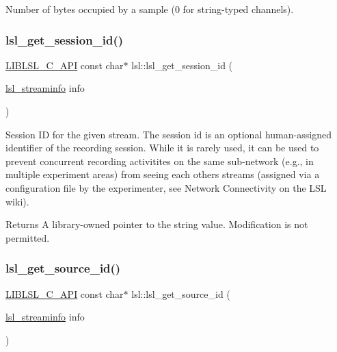 Number of bytes occupied by a sample (0 for string-\/typed channels). 

\mbox{\label{namespacelsl_ae28332bda70380cfd546fc158cd6f009}} 
\subsubsection{\texorpdfstring{lsl\+\_\+get\+\_\+session\+\_\+id()}{lsl\_get\_session\_id()}}
{\footnotesize\ttfamily \hyperlink{lsl__cpp_8h_aafd0ef1813e8be84a1420c4f1df64615}{L\+I\+B\+L\+S\+L\+\_\+\+C\+\_\+\+A\+PI} const char$\ast$ lsl\+::lsl\+\_\+get\+\_\+session\+\_\+id (\begin{DoxyParamCaption}\item[{\hyperlink{namespacelsl_aa0a9ce9956061679949daa2e35aae2e8}{lsl\+\_\+streaminfo}}]{info }\end{DoxyParamCaption})}

Session ID for the given stream. The session id is an optional human-\/assigned identifier of the recording session. While it is rarely used, it can be used to prevent concurrent recording activitites on the same sub-\/network (e.\+g., in multiple experiment areas) from seeing each other\textquotesingle{}s streams (assigned via a configuration file by the experimenter, see Network Connectivity on the L\+SL wiki). \begin{DoxyReturn}{Returns}
A library-\/owned pointer to the string value. Modification is not permitted. 
\end{DoxyReturn}
\mbox{\label{namespacelsl_ad2987f3c32e0edae147498a8870a3215}} 
\subsubsection{\texorpdfstring{lsl\+\_\+get\+\_\+source\+\_\+id()}{lsl\_get\_source\_id()}}
{\footnotesize\ttfamily \hyperlink{lsl__cpp_8h_aafd0ef1813e8be84a1420c4f1df64615}{L\+I\+B\+L\+S\+L\+\_\+\+C\+\_\+\+A\+PI} const char$\ast$ lsl\+::lsl\+\_\+get\+\_\+source\+\_\+id (\begin{DoxyParamCaption}\item[{\hyperlink{namespacelsl_aa0a9ce9956061679949daa2e35aae2e8}{lsl\+\_\+streaminfo}}]{info }\end{DoxyParamCaption})}

